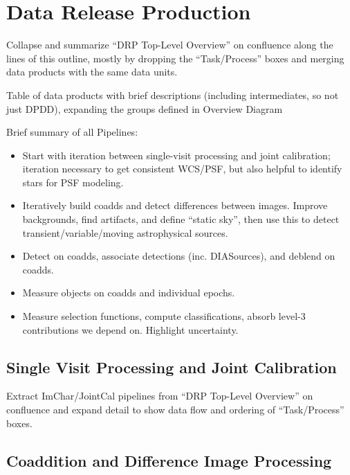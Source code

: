 \section{Data Release Production}

\begin{note}
Collapse and summarize ``DRP Top-Level Overview'' on confluence along the lines of this outline, mostly by dropping the ``Task/Process'' boxes and merging data products with the same data units.
\end{note}

\begin{note}
Table of data products with brief descriptions (including intermediates, so not just DPDD), expanding the groups defined in Overview Diagram
\end{note}

Brief summary of all Pipelines:
\begin{itemize}
\item Start with iteration between single-visit processing and joint calibration; iteration necessary to get consistent WCS/PSF, but also helpful to identify stars for PSF modeling.
\item Iteratively build coadds and detect differences between images.  Improve backgrounds, find artifacts, and define ``static sky'', then use this to detect transient/variable/moving astrophysical sources.
\item Detect on coadds, associate detections (inc. DIASources), and deblend on coadds.
\item Measure objects on coadds and individual epochs.
\item Measure selection functions, compute classifications, absorb level-3 contributions we depend on.  Highlight uncertainty.
\end{itemize}

\subsection{Single Visit Processing and Joint Calibration}

\begin{note}
Extract ImChar/JointCal pipelines from ``DRP Top-Level Overview'' on confluence and expand detail to show data flow and ordering of ``Task/Process'' boxes.
\end{note}

\subsection{Coaddition and Difference Image Processing}

